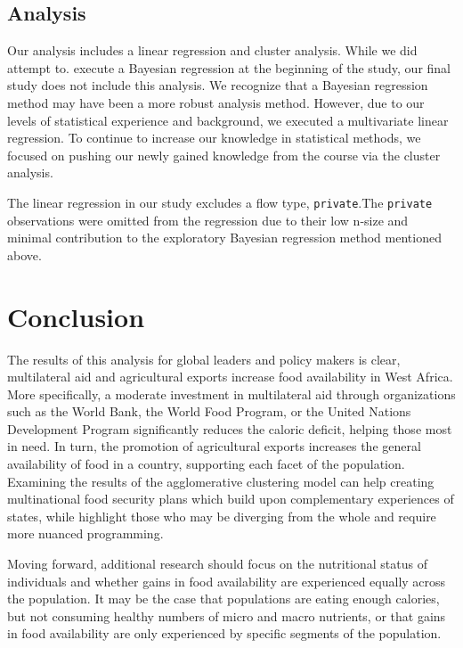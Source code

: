 \documentclass[
]{article}
\begin{document}
\hypertarget{analysis}{%
\subsection{Analysis}\label{analysis}}

Our analysis includes a linear regression and cluster analysis. While we
did attempt to. execute a Bayesian regression at the beginning of the
study, our final study does not include this analysis. We recognize that
a Bayesian regression method may have been a more robust analysis
method. However, due to our levels of statistical experience and
background, we executed a multivariate linear regression. To continue to
increase our knowledge in statistical methods, we focused on pushing our
newly gained knowledge from the course via the cluster analysis.

The linear regression in our study excludes a flow type,
\texttt{private}.The \texttt{private} observations were omitted from the
regression due to their low n-size and minimal contribution to the
exploratory Bayesian regression method mentioned above.

\hypertarget{conclusion}{%
\section{Conclusion}\label{conclusion}}

The results of this analysis for global leaders and policy makers is
clear, multilateral aid and agricultural exports increase food
availability in West Africa. More specifically, a moderate investment in
multilateral aid through organizations such as the World Bank, the World
Food Program, or the United Nations Development Program significantly
reduces the caloric deficit, helping those most in need. In turn, the
promotion of agricultural exports increases the general availability of
food in a country, supporting each facet of the population. Examining
the results of the agglomerative clustering model can help creating
multinational food security plans which build upon complementary
experiences of states, while highlight those who may be diverging from
the whole and require more nuanced programming.

Moving forward, additional research should focus on the nutritional
status of individuals and whether gains in food availability are
experienced equally across the population. It may be the case that
populations are eating enough calories, but not consuming healthy
numbers of micro and macro nutrients, or that gains in food availability
are only experienced by specific segments of the population.
\end{document}
